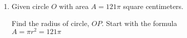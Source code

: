 \begin{enumerate}
\item Given circle $O$ with area $A=121 \pi$ square centimeters.
  \begin{multicols}{2}
  \raggedcolumns
  Find the radius of circle, $OP$. Start with the formula\\[0.5cm]
  $A = \pi r^2 = 121 \pi$ \vspace{1.7cm}
  \end{multicols}

\end{enumerate}
